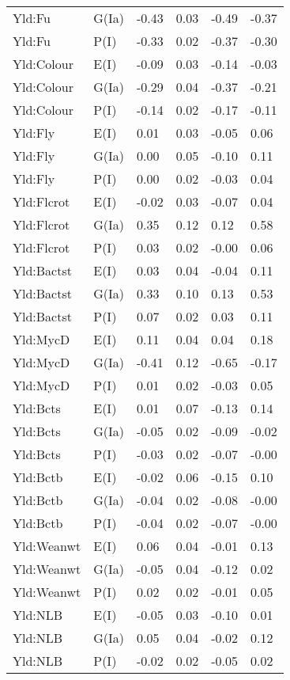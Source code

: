 \begin{center}
\begin{longtable}{|p{1.1in}|p{0.7in}|p{0.7in}|p{0.6in}|p{0.6in}|p{0.6in}|}
  Yld:Fu & G(Ia) & -0.43 & 0.03 & -0.49 & -0.37 \\ 
  Yld:Fu & P(I) & -0.33 & 0.02 & -0.37 & -0.30 \\ 
  Yld:Colour & E(I) & -0.09 & 0.03 & -0.14 & -0.03 \\ 
  Yld:Colour & G(Ia) & -0.29 & 0.04 & -0.37 & -0.21 \\ 
  Yld:Colour & P(I) & -0.14 & 0.02 & -0.17 & -0.11 \\ 
  Yld:Fly & E(I) & 0.01 & 0.03 & -0.05 & 0.06 \\ 
  Yld:Fly & G(Ia) & 0.00 & 0.05 & -0.10 & 0.11 \\ 
  Yld:Fly & P(I) & 0.00 & 0.02 & -0.03 & 0.04 \\ 
  Yld:Flcrot & E(I) & -0.02 & 0.03 & -0.07 & 0.04 \\ 
  Yld:Flcrot & G(Ia) & 0.35 & 0.12 & 0.12 & 0.58 \\ 
  Yld:Flcrot & P(I) & 0.03 & 0.02 & -0.00 & 0.06 \\ 
  Yld:Bactst & E(I) & 0.03 & 0.04 & -0.04 & 0.11 \\ 
  Yld:Bactst & G(Ia) & 0.33 & 0.10 & 0.13 & 0.53 \\ 
  Yld:Bactst & P(I) & 0.07 & 0.02 & 0.03 & 0.11 \\ 
  Yld:MycD & E(I) & 0.11 & 0.04 & 0.04 & 0.18 \\ 
  Yld:MycD & G(Ia) & -0.41 & 0.12 & -0.65 & -0.17 \\ 
  Yld:MycD & P(I) & 0.01 & 0.02 & -0.03 & 0.05 \\ 
  Yld:Bcts & E(I) & 0.01 & 0.07 & -0.13 & 0.14 \\ 
  Yld:Bcts & G(Ia) & -0.05 & 0.02 & -0.09 & -0.02 \\ 
  Yld:Bcts & P(I) & -0.03 & 0.02 & -0.07 & -0.00 \\ 
  Yld:Bctb & E(I) & -0.02 & 0.06 & -0.15 & 0.10 \\ 
  Yld:Bctb & G(Ia) & -0.04 & 0.02 & -0.08 & -0.00 \\ 
  Yld:Bctb & P(I) & -0.04 & 0.02 & -0.07 & -0.00 \\ 
  Yld:Weanwt & E(I) & 0.06 & 0.04 & -0.01 & 0.13 \\ 
  Yld:Weanwt & G(Ia) & -0.05 & 0.04 & -0.12 & 0.02 \\ 
  Yld:Weanwt & P(I) & 0.02 & 0.02 & -0.01 & 0.05 \\ 
  Yld:NLB & E(I) & -0.05 & 0.03 & -0.10 & 0.01 \\ 
  Yld:NLB & G(Ia) & 0.05 & 0.04 & -0.02 & 0.12 \\ 
  Yld:NLB & P(I) & -0.02 & 0.02 & -0.05 & 0.02 \\ 

\end{longtable}
\end{center}
